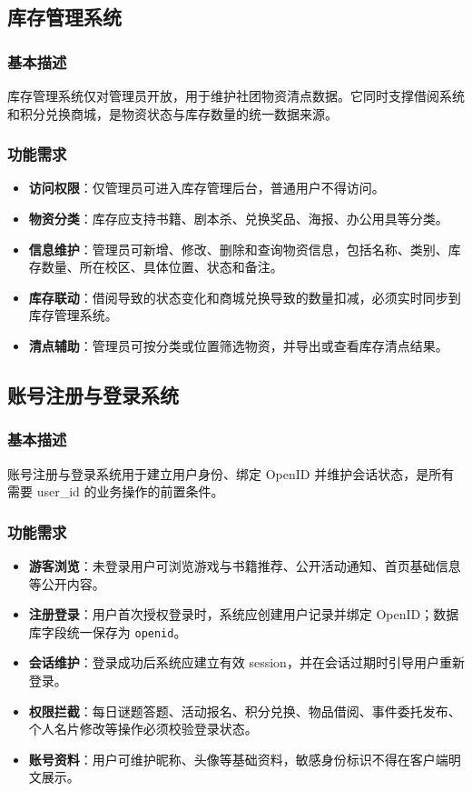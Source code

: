 \documentclass[a4paper,12pt]{article}
\begin{document}
\subsection{库存管理系统}

\subsubsection{基本描述}
库存管理系统仅对管理员开放，用于维护社团物资清点数据。它同时支撑借阅系统和积分兑换商城，是物资状态与库存数量的统一数据来源。

\subsubsection{功能需求}
\begin{itemize}
    \item \textbf{访问权限}：仅管理员可进入库存管理后台，普通用户不得访问。
    \item \textbf{物资分类}：库存应支持书籍、剧本杀、兑换奖品、海报、办公用具等分类。
    \item \textbf{信息维护}：管理员可新增、修改、删除和查询物资信息，包括名称、类别、库存数量、所在校区、具体位置、状态和备注。
    \item \textbf{库存联动}：借阅导致的状态变化和商城兑换导致的数量扣减，必须实时同步到库存管理系统。
    \item \textbf{清点辅助}：管理员可按分类或位置筛选物资，并导出或查看库存清点结果。
\end{itemize}

\subsection{账号注册与登录系统}

\subsubsection{基本描述}
账号注册与登录系统用于建立用户身份、绑定 OpenID 并维护会话状态，是所有需要 user\_id 的业务操作的前置条件。

\subsubsection{功能需求}
\begin{itemize}
    \item \textbf{游客浏览}：未登录用户可浏览游戏与书籍推荐、公开活动通知、首页基础信息等公开内容。
    \item \textbf{注册登录}：用户首次授权登录时，系统应创建用户记录并绑定 OpenID；数据库字段统一保存为 \texttt{openid}。
    \item \textbf{会话维护}：登录成功后系统应建立有效 session，并在会话过期时引导用户重新登录。
    \item \textbf{权限拦截}：每日谜题答题、活动报名、积分兑换、物品借阅、事件委托发布、个人名片修改等操作必须校验登录状态。
    \item \textbf{账号资料}：用户可维护昵称、头像等基础资料，敏感身份标识不得在客户端明文展示。
\end{itemize}
\end{document}
